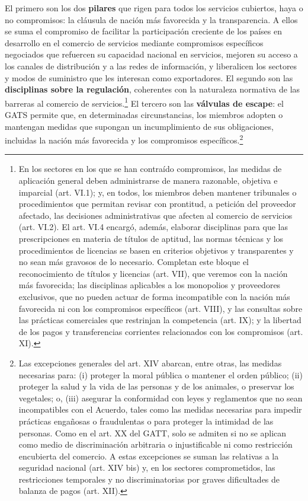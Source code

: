\documentclass[10pt,a4paper]{article}
\begin{document}
El primero son los dos \textbf{pilares} que rigen para todos los servicios cubiertos, haya o no compromisos: la cláusula de nación más favorecida y la transparencia. A ellos se suma el compromiso de facilitar la participación creciente de los países en desarrollo en el comercio de servicios mediante compromisos específicos negociados que refuercen su capacidad nacional en servicios, mejoren su acceso a los canales de distribución y a las redes de información, y liberalicen los sectores y modos de suministro que les interesan como exportadores. El segundo son las \textbf{disciplinas sobre la regulación}, coherentes con la naturaleza normativa de las barreras al comercio de servicios.\footnote{%
  En los sectores en los que se han contraído compromisos, las medidas de aplicación general deben administrarse de manera razonable, objetiva e imparcial (art. VI.1); y, en todos, los miembros deben mantener tribunales o procedimientos que permitan revisar con prontitud, a petición del proveedor afectado, las decisiones administrativas que afecten al comercio de servicios (art. VI.2). El art. VI.4 encargó, además, elaborar disciplinas para que las prescripciones en materia de títulos de aptitud, las normas técnicas y los procedimientos de licencias se basen en criterios objetivos y transparentes y no sean más gravosos de lo necesario. Completan este bloque el reconocimiento de títulos y licencias (art. VII), que veremos con la nación más favorecida; las disciplinas aplicables a los monopolios y proveedores exclusivos, que no pueden actuar de forma incompatible con la nación más favorecida ni con los compromisos específicos (art. VIII), y las consultas sobre las prácticas comerciales que restrinjan la competencia (art. IX); y la libertad de los pagos y transferencias corrientes relacionados con los compromisos (art. XI).
} El tercero son las \textbf{válvulas de escape}: el GATS permite que, en determinadas circunstancias, los miembros adopten o mantengan medidas que supongan un incumplimiento de sus obligaciones, incluidas la nación más favorecida y los compromisos específicos.\footnote{%
  Las excepciones generales del art. XIV abarcan, entre otras, las medidas necesarias para: (i) proteger la moral pública o mantener el orden público; (ii) proteger la salud y la vida de las personas y de los animales, o preservar los vegetales; o, (iii) asegurar la conformidad con leyes y reglamentos que no sean incompatibles con el Acuerdo, tales como las medidas necesarias para impedir prácticas engañosas o fraudulentas o para proteger la intimidad de las personas. Como en el art. XX del GATT, solo se admiten si no se aplican como medio de discriminación arbitraria o injustificable ni como restricción encubierta del comercio. A estas excepciones se suman las relativas a la seguridad nacional (art. XIV bis) y, en los sectores comprometidos, las restricciones temporales y no discriminatorias por graves dificultades de balanza de pagos (art. XII).

}
\end{document}
